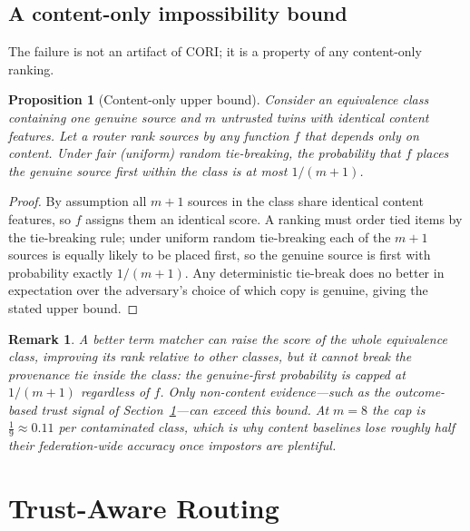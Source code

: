 \documentclass[preprint,12pt]{elsarticle}
\newtheorem{proposition}{Proposition}
\newtheorem{remark}{Remark}
\begin{document}
\subsection{A content-only impossibility bound}
The failure is not an artifact of CORI; it is a property of any content-only
ranking.

\begin{proposition}[Content-only upper bound]\label{prop:bound}
Consider an equivalence class containing one genuine source and $m$ untrusted
twins with identical content features. Let a router rank sources by any function
$f$ that depends only on content. Under fair (uniform) random tie-breaking, the
probability that $f$ places the genuine source first within the class is at most
$1/(m{+}1)$.
\end{proposition}

\begin{proof}
By assumption all $m{+}1$ sources in the class share identical content features,
so $f$ assigns them an identical score. A ranking must order tied items by the
tie-breaking rule; under uniform random tie-breaking each of the $m{+}1$ sources
is equally likely to be placed first, so the genuine source is first with
probability exactly $1/(m{+}1)$. Any deterministic tie-break does no better in
expectation over the adversary's choice of which copy is genuine, giving the
stated upper bound.
\end{proof}

\begin{remark}
A better term matcher can raise the score of the \emph{whole} equivalence class,
improving its rank relative to other classes, but it cannot break the provenance
tie \emph{inside} the class: the genuine-first probability is capped at
$1/(m{+}1)$ regardless of $f$. Only non-content evidence---such as the
outcome-based trust signal of Section~\ref{sec:method}---can exceed this bound.
At $m=8$ the cap is $\tfrac{1}{9}\approx 0.11$ \emph{per contaminated class},
which is why content baselines lose roughly half their federation-wide accuracy
once impostors are plentiful.
\end{remark}

\section{Trust-Aware Routing}\label{sec:method}
\end{document}
